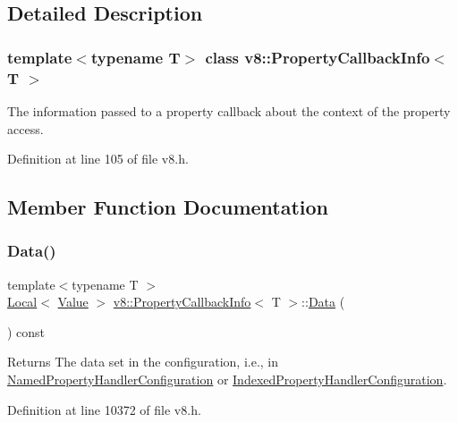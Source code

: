 \subsection{Detailed Description}
\subsubsection*{template$<$typename T$>$\newline
class v8\+::\+Property\+Callback\+Info$<$ T $>$}

The information passed to a property callback about the context of the property access. 

Definition at line 105 of file v8.\+h.



\subsection{Member Function Documentation}
\mbox{\label{classv8_1_1PropertyCallbackInfo_a0156bad4329132beddee04f2d000c617}} 
\subsubsection{\texorpdfstring{Data()}{Data()}}
{\footnotesize\ttfamily template$<$typename T $>$ \\
\mbox{\hyperlink{classv8_1_1Local}{Local}}$<$ \mbox{\hyperlink{classv8_1_1Value}{Value}} $>$ \mbox{\hyperlink{classv8_1_1PropertyCallbackInfo}{v8\+::\+Property\+Callback\+Info}}$<$ T $>$\+::\mbox{\hyperlink{classv8_1_1Data}{Data}} (\begin{DoxyParamCaption}{ }\end{DoxyParamCaption}) const}

\begin{DoxyReturn}{Returns}
The data set in the configuration, i.\+e., in {\ttfamily \mbox{\hyperlink{structv8_1_1NamedPropertyHandlerConfiguration}{Named\+Property\+Handler\+Configuration}}} or {\ttfamily \mbox{\hyperlink{structv8_1_1IndexedPropertyHandlerConfiguration}{Indexed\+Property\+Handler\+Configuration}}.} 
\end{DoxyReturn}


Definition at line 10372 of file v8.\+h.

\mbox{\label{classv8_1_1PropertyCallbackInfo_aff7b838ede308ab8a42890962eb9271c}} 
